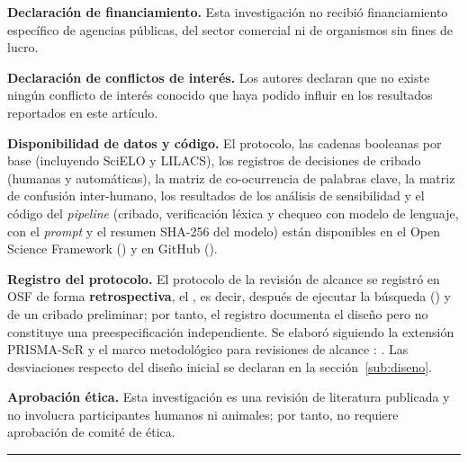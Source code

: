 \begin{small}

\noindent\textbf{Declaración de financiamiento.}
Esta investigación no recibió financiamiento específico de agencias públicas,
del sector comercial ni de organismos sin fines de lucro.

\medskip
\noindent\textbf{Declaración de conflictos de interés.}
Los autores declaran que no existe ningún conflicto de interés conocido que
haya podido influir en los resultados reportados en este artículo.

\medskip
\noindent\textbf{Disponibilidad de datos y código.}
El protocolo, las cadenas booleanas por base (incluyendo SciELO y LILACS), los
registros de decisiones de cribado (humanas y automáticas), la matriz de
co-ocurrencia de palabras clave, la matriz de confusión inter-humano, los
resultados de los análisis de sensibilidad y el código del \textit{pipeline}
(cribado, verificación léxica y chequeo con modelo de lenguaje, con el
\textit{prompt} y el resumen SHA-256 del modelo) están disponibles en el Open
Science Framework (\href{\URLOSF}{\OSFTexto}) y en GitHub
(\href{\URLGitHub}{\GitHubTexto}).

\medskip
\noindent\textbf{Registro del protocolo.}
El protocolo de la revisión de alcance se registró en OSF de forma
\textbf{retrospectiva}, el \FechaRegistroOSF, es decir, después de ejecutar la
búsqueda (\FechaBusqueda) y de un cribado preliminar; por tanto, el registro
documenta el diseño pero no constituye una preespecificación independiente. Se
elaboró siguiendo la extensión PRISMA-ScR \parencite{tricco2018prismascr} y el
marco metodológico para revisiones de alcance
\parencite{arksey2005scoping,munn2018scoping}:
\href{\URLOSF}{\OSFTexto}. Las desviaciones respecto del diseño inicial se
declaran en la sección~\ref{sub:diseno}.

\medskip
\noindent\textbf{Aprobación ética.}
Esta investigación es una revisión de literatura publicada y no involucra
participantes humanos ni animales; por tanto, no requiere aprobación de
comité de ética.

\end{small}

\vspace{0.5em}
\hrule
\vspace{0.5em}

